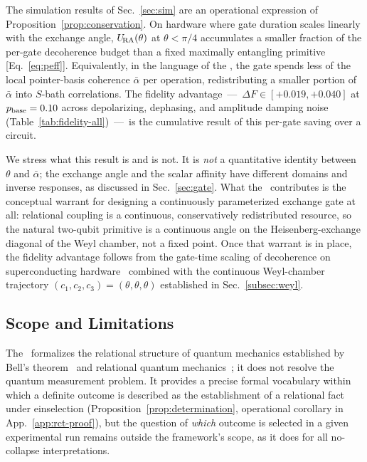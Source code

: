 The simulation results of Sec.~\ref{sec:sim} are an operational
expression of Proposition~\ref{prop:conservation}.
On hardware where gate duration scales linearly with the exchange angle,
$U_{\!\mathrm{RA}}(\theta)$ at $\theta < \pi/4$ accumulates a smaller fraction of the
per-gate decoherence budget than a fixed maximally entangling primitive
[Eq.~\eqref{eq:peff}].
Equivalently, in the language of the \RCT, the gate spends less of the
local pointer-basis coherence $\bar\alpha$ per operation, redistributing
a smaller portion of $\bar\alpha$ into $S$-bath correlations.
The fidelity advantage~---~$\Delta F \in [+0.019,+0.040]$ at
$p_{\rm base} = 0.10$ across depolarizing, dephasing, and amplitude
damping noise (Table~\ref{tab:fidelity-all})~---~is the cumulative
result of this per-gate saving over a circuit.

We stress what this result is and is not.
It is \emph{not} a quantitative identity between $\theta$ and
$\bar\alpha$; the exchange angle and the scalar affinity have different
domains and inverse responses, as discussed in Sec.~\ref{sec:gate}.
What the \RCT~contributes is the conceptual warrant for designing a
continuously parameterized exchange gate at all: relational coupling is
a continuous, conservatively redistributed resource, so the natural
two-qubit primitive is a continuous angle on the Heisenberg-exchange
diagonal of the Weyl chamber, not a fixed point.
Once that warrant is in place, the fidelity advantage follows from the
gate-time scaling of decoherence on superconducting
hardware~\cite{Krantz2019} combined with the continuous Weyl-chamber
trajectory $(c_1,c_2,c_3) = (\theta,\theta,\theta)$ established in
Sec.~\ref{subsec:weyl}.

\subsection{Scope and Limitations}

The \RCT~formalizes the relational structure of quantum mechanics
established by Bell's theorem~\cite{Bell1964} and relational quantum
mechanics~\cite{Rovelli1996,Rovelli2021}; it does not resolve the
quantum measurement problem.
It provides a precise formal vocabulary within which a definite outcome
is described as the establishment of a relational fact under
einselection (Proposition~\ref{prop:determination}, operational
corollary in App.~\ref{app:rct-proof}), but the question of
\emph{which} outcome is selected in a given experimental run remains
outside the framework's scope, as it does for all no-collapse
interpretations.

